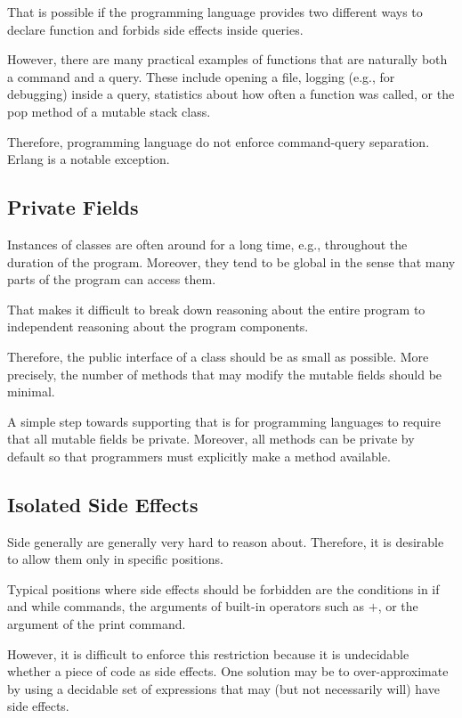 That is possible if the programming language provides two different ways to declare function and forbids side effects inside queries.

However, there are many practical examples of functions that are naturally both a command and a query.
These include opening a file, logging (e.g., for debugging) inside a query, statistics about how often a function was called, or the pop method of a mutable stack class.

Therefore, programming language do not enforce command-query separation.
Erlang is a notable exception.

\subsection{Private Fields}

Instances of classes are often around for a long time, e.g., throughout the duration of the program.
Moreover, they tend to be global in the sense that many parts of the program can access them.

That makes it difficult to break down reasoning about the entire program to independent reasoning about the program components.

Therefore, the public interface of a class should be as small as possible.
More precisely, the number of methods that may modify the mutable fields should be minimal.

A simple step towards supporting that is for programming languages to require that all mutable fields be private.
Moreover, all methods can be private by default so that programmers must explicitly make a method available.

\subsection{Isolated Side Effects}

Side generally are generally very hard to reason about.
Therefore, it is desirable to allow them only in specific positions.

Typical positions where side effects should be forbidden are the conditions in if and while commands, the arguments of built-in operators such as $+$, or the argument of the print command.

However, it is difficult to enforce this restriction because it is undecidable whether a piece of code as side effects.
One solution may be to over-approximate by using a decidable set of expressions that may (but not necessarily will) have side effects.